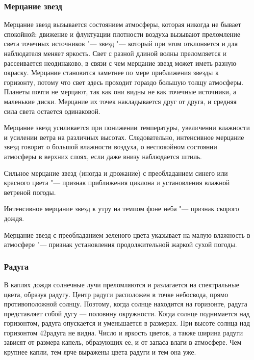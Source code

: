 \subsubsection{Мерцание звезд}

Мерцание звезд вызывается состоянием атмосферы, которая никогда не
бывает спокойной: движение и флуктуации плотности воздуха вызывают
преломление света точечных источников "--- звезд "--- который при этом
отклоняется и для наблюдателя меняет яркость. Свет с разной длиной
волны преломляется и рассеивается неодинаково, в связи с чем мерцание
звезд может иметь разную окраску. Мерцание становится заметнее по мере
приближения звезды к горизонту, потому что свет здесь проходит гораздо
большую толщу атмосферы. Планеты почти не мерцают, так как они видны
не как точечные источники, а маленькие диски. Мерцание их точек
накладывается друг от друга, и средняя сила света остается одинаковой.

Мерцание звезд усиливается при понижении температуры, увеличении
влажности и усилении ветра на различных высотах. Следовательно,
интенсивное мерцание звезд говорит о большой влажности воздуха, о
неспокойном состоянии атмосферы в верхних слоях, если даже внизу
наблюдается штиль.

 Сильное мерцание звезд (иногда и дрожание) с преобладанием
синего или красного цвета "--- признак приближения циклона и установления
влажной ветреной погоды.

 Интенсивное мерцание звезд к утру на темпом фоне неба "---
признак скорого дождя.

 Мерцание звезд с преобладанием зеленого цвета указывает на
малую влажность в атмосфере "--- признак установления продолжительной
жаркой сухой погоды.

\subsubsection{Радуга}

В каплях дождя солнечные лучи преломляются и разлагается на
спектральные цвета, образуя радугу. Центр радуги расположен в точке
небосвода, прямо противоположной солнцу. Поэтому, когда солнце
находится на горизонте, радуга представляет собой дугу — половину
окружности. Когда солнце поднимается над горизонтом, радуга опускается
и уменьшается в размерах. При высоте солнца над горизонтом 42\gr радуга
не видна. Число и яркость цветов, а также ширина радуги зависят от
размера капель, образующих ее, и от запаса влаги в атмосфере. Чем
крупнее капли, тем ярче выражены цвета радуги и тем она уже.

